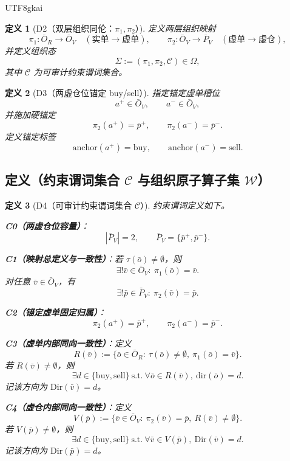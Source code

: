 \documentclass[12pt]{article}
\newtheorem{definition}{定义}[section]
\begin{document}
\begin{CJK*}{UTF8}{gkai}
\begin{definition}[D2（双层组织同伦：$\pi_1,\pi_2$）]
\label{def:tex28-ch19-d2}
定义两层组织映射
\[
  \pi_1:\bar O_R\to\bar O_V\quad(\text{实单}\to\text{虚单}),
  \qquad
  \pi_2:\bar O_V\to\bar P_V\quad(\text{虚单}\to\text{虚仓}),
\]
并定义组织态
\[
  \Sigma:=(\pi_1,\pi_2,\mathcal C)\in\Omega,
\]
其中 $\mathcal C$ 为可审计约束谓词集合。
\end{definition}

\begin{definition}[D3（两虚仓位锚定 buy/sell）]
\label{def:tex28-ch19-d3}
指定锚定虚单槽位
\[
  a^+\in\bar O_V,\qquad a^-\in\bar O_V,
\]
并施加硬锚定
\[
  \pi_2(a^+)=\bar p^+,\qquad \pi_2(a^-)=\bar p^-.
\]
定义锚定标签
\[
  \mathrm{anchor}(a^+)=\mathrm{buy},
  \qquad
  \mathrm{anchor}(a^-)=\mathrm{sell}.
\]
\end{definition}

\subsection{定义（约束谓词集合 $\mathcal C$ 与组织原子算子集 $\mathcal W$）}
\label{subsec:tex28-ch19-constraints-ops}

\begin{definition}[D4（可审计约束谓词集合 $\mathcal C$）]
\label{def:tex28-ch19-d4}
约束谓词定义如下。

\textbf{C0（两虚仓位容量）}：
\[
  |\bar P_V|=2,\qquad
  \bar P_V=\{\bar p^+,\bar p^-\}.
\]

\textbf{C1（映射总定义与一致性）}：若 $\tau(\bar o)\neq\emptyset$，则
\[
  \exists!\bar v\in\bar O_V:\ \pi_1(\bar o)=\bar v.
\]
对任意 $\bar v\in\bar O_V$，有
\[
  \exists!\bar p\in\bar P_V:\ \pi_2(\bar v)=\bar p.
\]

\textbf{C2（锚定虚单固定归属）}：
\[
  \pi_2(a^+)=\bar p^+,\qquad
  \pi_2(a^-)=\bar p^-.
\]

\textbf{C3（虚单内部同向一致性）}：定义
\[
  R(\bar v):=\{\bar o\in\bar O_R:\ \tau(\bar o)\neq\emptyset,\ \pi_1(\bar o)=\bar v\}.
\]
若 $R(\bar v)\neq\emptyset$，则
\[
  \exists d\in\{\mathrm{buy},\mathrm{sell}\}\ \text{s.t.}\
  \forall \bar o\in R(\bar v),\ \mathrm{dir}(\bar o)=d.
\]
记该方向为 $\mathrm{Dir}(\bar v)=d$。

\textbf{C4（虚仓内部同向一致性）}：定义
\[
  V(\bar p):=\{\bar v\in\bar O_V:\ \pi_2(\bar v)=\bar p,\ R(\bar v)\neq\emptyset\}.
\]
若 $V(\bar p)\neq\emptyset$，则
\[
  \exists d\in\{\mathrm{buy},\mathrm{sell}\}\ \text{s.t.}\
  \forall \bar v\in V(\bar p),\ \mathrm{Dir}(\bar v)=d.
\]
记该方向为 $\mathrm{Dir}(\bar p)=d$。


\end{definition}
\end{CJK*}
\end{document}
